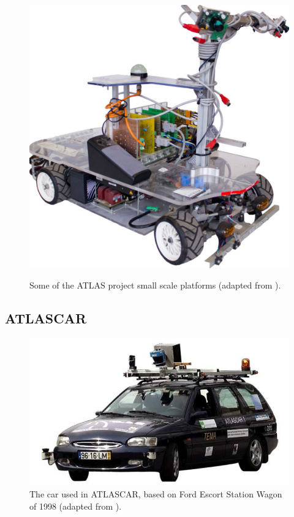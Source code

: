 \begin{figure}[!h]
\begin{minipage}[t]{0.32\textwidth}
			\label{fig:modelosatlas2}
		\end{minipage}
		\begin{minipage}[t]{0.32\textwidth}
			\includegraphics[width=\textwidth]{../figure/modelosatlas3.pdf}
			\label{fig:modelosatlas3}
		\end{minipage}
		\caption{Some of the ATLAS project small scale platforms (adapted from \cite{Pereira2012}).}
		\label{fig:modelosatlas}
\end{figure}

\subsection{ATLASCAR}\label{sec:ATLASCAR}
\begin{figure}[!h]
	\centering
	\includegraphics[width=\textwidth]{../figure/atlascar1.jpg}
	\caption{The car used in ATLASCAR, based on Ford Escort Station Wagon of 1998 (adapted from \cite{Pereira2012}).}
	\label{fig:atlascar1}
\end{figure}

